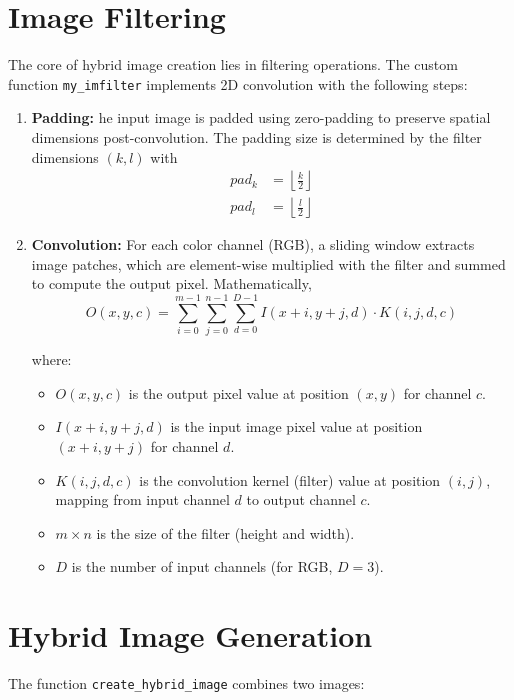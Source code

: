 \documentclass[12pt]{report}
\begin{document}
\section{Image Filtering}
The core of hybrid image creation lies in filtering operations. The custom function \texttt{my\_imfilter} implements 2D convolution with the following steps:

\begin{enumerate}
	\setlength\itemsep{-1.05em}

	\item{\textbf{Padding: }}he input image is padded using zero-padding to preserve spatial dimensions post-convolution. The padding size is determined by the filter dimensions $ (k, l) $ with \label{sec:impadding}
	\begin{equation}
			\begin{aligned}
					pad_k &= \left\lfloor \frac{k}{2} \right\rfloor \\
					pad_l &= \left\lfloor \frac{l}{2} \right\rfloor
			\end{aligned}
	\end{equation}
	\item{\textbf{Convolution: }}For each color channel (RGB), a sliding window extracts image patches, which are element-wise multiplied with the filter and summed to compute the output pixel. Mathematically, \label{sec:imconvolution}
	\[
	O(x, y, c) = \sum_{i=0}^{m-1} \sum_{j=0}^{n-1} \sum_{d=0}^{D-1} I(x + i, y + j, d) \cdot K(i, j, d, c)
	\]

	where:
	\begin{itemize}
		\setlength\itemsep{-1.05em}
			\item \( O(x, y, c) \) is the output pixel value at position \( (x, y) \) for channel \( c \).
			\item \( I(x + i, y + j, d) \) is the input image pixel value at position \( (x + i, y + j) \) for channel \( d \).
			\item \( K(i, j, d, c) \) is the convolution kernel (filter) value at position \( (i, j) \), mapping from input channel \( d \) to output channel \( c \).
			\item \( m \times n \) is the size of the filter (height and width).
			\item \( D \) is the number of input channels (for RGB, \( D = 3 \)).
	\end{itemize}

\end{enumerate}


\section{Hybrid Image Generation}
The function \texttt{create\_hybrid\_image} combines two images:
\end{document}
